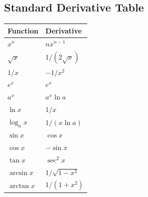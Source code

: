 \subsection*{Standard Derivative Table}

\begin{center}
\begin{tabular}{ll}
\toprule
Function & Derivative \\
\midrule
\(x^n\) & \(nx^{n-1}\) \\
\(\sqrt{x}\) & \(1/(2\sqrt{x})\) \\
\(1/x\) & \(-1/x^2\) \\
\(e^x\) & \(e^x\) \\
\(a^x\) & \(a^x\ln a\) \\
\(\ln x\) & \(1/x\) \\
\(\log_a x\) & \(1/(x\ln a)\) \\
\(\sin x\) & \(\cos x\) \\
\(\cos x\) & \(-\sin x\) \\
\(\tan x\) & \(\sec^2 x\) \\
\(\arcsin x\) & \(1/\sqrt{1-x^2}\) \\
\(\arctan x\) & \(1/(1+x^2)\) \\
\bottomrule
\end{tabular}
\end{center}
